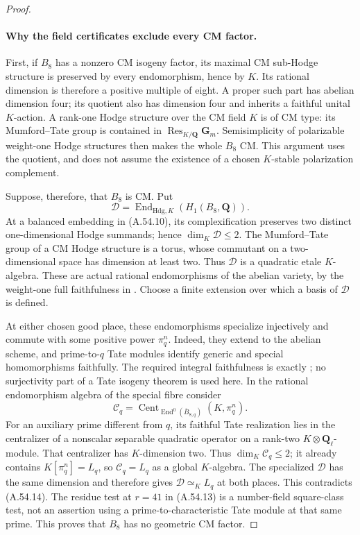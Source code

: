 \begin{proof}
\paragraph{Why the field certificates exclude every CM factor.}
First, if \(B_8\) has a nonzero CM isogeny factor, its maximal
CM sub-Hodge structure is preserved by every endomorphism,
hence by \(K\). Its rational dimension is therefore a positive
multiple of eight. A proper such part has abelian dimension four;
its quotient also has dimension four and inherits a faithful
unital \(K\)-action. A rank-one Hodge structure over the CM
field \(K\) is of CM type: its Mumford--Tate group is contained
in \(\operatorname{Res}_{K/\mathbf Q}\mathbf G_m\).
Semisimplicity of polarizable weight-one Hodge structures then
makes the whole \(B_8\) CM. This argument uses the quotient,
and does not assume the existence of a chosen \(K\)-stable
polarization complement.

Suppose, therefore, that \(B_8\) is CM. Put
\[
 \mathcal D=\operatorname{End}_{\mathrm{Hdg},K}
                  (H_1(B_8,\mathbf Q)).
\]
At a balanced embedding in (A.54.10), its complexification
preserves two distinct one-dimensional Hodge summands; hence
\(\dim_K\mathcal D\le2\). The Mumford--Tate group of a CM
Hodge structure is a torus, whose commutant on a two-dimensional
space has dimension at least two. Thus \(\mathcal D\) is a
quadratic etale \(K\)-algebra. These are actual rational
endomorphisms of the abelian variety, by the weight-one full
faithfulness in \cite[Theorems 4.4 and 7.12, pp.489 and 508;
CM discussion on pp.509 and 519]{fghMilneSVModuli}.
Choose a finite extension over which a basis of \(\mathcal D\)
is defined.

At either chosen good place, these endomorphisms specialize
injectively and commute with some positive power \(\pi_q^n\).
Indeed, they extend to the abelian scheme, and prime-to-\(q\)
Tate modules identify generic and special homomorphisms
faithfully. The required integral faithfulness is exactly
\cite[Theorem 10.15, pp.49--50]{fghMilneAV2008}; no surjectivity
part of a Tate isogeny theorem is used here.
In the rational endomorphism algebra of the special fibre consider
\[
 \mathcal C_q=\operatorname{Cent}_{\operatorname{End}^0(\overline B_{8,q})}
                          (K,\pi_q^n).
\]
For an auxiliary prime different from \(q\), its faithful
Tate realization lies in the centralizer of a nonscalar
separable quadratic operator on a rank-two
\(K\otimes\mathbf Q_\ell\)-module. That centralizer has
\(K\)-dimension two. Thus \(\dim_K\mathcal C_q\le2\);
it already contains \(K[\pi_q^n]=L_q\), so
\(\mathcal C_q=L_q\) as a global \(K\)-algebra.
The specialized \(\mathcal D\) has the same dimension and
therefore gives \(\mathcal D\simeq_K L_q\) at both places.
This contradicts (A.54.14).
The residue test at \(r=41\) in (A.54.13) is a number-field
square-class test, not an assertion using a prime-to-characteristic
Tate module at that same prime. This proves that \(B_8\)
has no geometric CM factor.


\end{proof}
